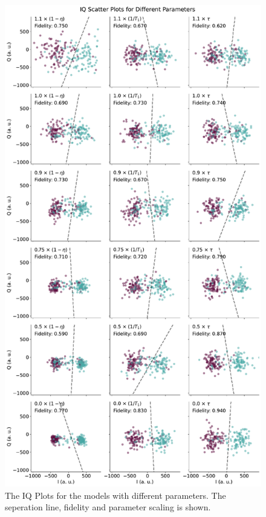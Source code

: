 \begin{figure}
    \centering
    \includegraphics{Simulations/budgets/figures/iq_scatter_budgetting.pdf}
    \caption{The IQ Plots for the models  with different parameters. The seperation line, fidelity and parameter scaling is shown.}
    \label{fig:budgetting_IQ_plots}
\end{figure}


